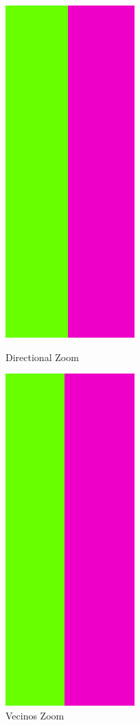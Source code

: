 \newpage
\begin{figure}[!htb]
\begin{center}
    \includegraphics[scale=0.6]{imagenes/colores_directional_zoom.jpg}
    \caption{Directional Zoom}
        \end{center}
\endminipage
{}
\begin{center}
    \includegraphics[scale=0.6]{imagenes/colores_vecinos_zoom.jpg}
    \caption{Vecinos Zoom}
        \end{center}
\endminipage 
\end{figure}


